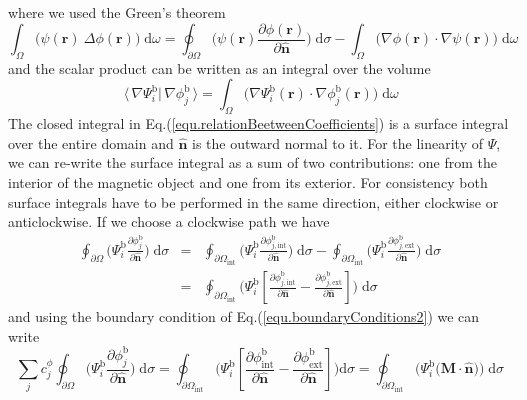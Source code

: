 \documentclass[11pt]{article}
\renewcommand{\d}{\mathrm{d}} %
\newcommand{\rv}[1]{\ensuremath{\mathbf{#1}}} %
\newcommand{\ivc}[1]{\,\langle\,#1|}
\begin{document}
where we used the Green's theorem
\begin{equation}
{\displaystyle \int}_\Omega \bigg( \psi(\rv{r}) \: \Delta \phi(\rv{r}) \bigg)\; \d\omega 
=
\oint_{\partial \Omega} 
\bigg( \psi(\rv{r}) 
\frac{\partial \phi(\rv{r})}{
  \partial \rv{\hat{n}}} \bigg) \; \d \sigma 
- 
\int_\Omega \bigg( \nabla  \phi(\rv{r}) \cdot \nabla  \psi(\rv{r}) \bigg)
\; \d\omega
\label{equ.greenTheorem}
\end{equation} 
and the scalar product can be written as an integral over the volume
\begin{equation}
\ivc{ \nabla \Psi^\mathrm{b}_{i}} \, 
  \nabla \phi^\mathrm{b}_{j} \,\rangle 
= \int_\Omega \bigg( \nabla  \Psi^\mathrm{b}_{i} (\rv{r}) \cdot \nabla
\phi^\mathrm{b}_{j} (\rv{r}) \bigg) 
\; \d\omega
\label{equ.scalarProductDefinition}
\end{equation}
The closed integral in  Eq.(\ref{equ.relationBeetweenCoefficients}) is
a surface integral over the entire domain and $\rv{\hat{n}}$ is the
outward normal to it.
For the linearity of $\Psi$, we can re-write the surface
integral as a sum of two contributions: one from the interior of the
magnetic object and one from its exterior. For consistency 
both surface integrals have to be performed in the same direction, 
either clockwise or anticlockwise. If we choose a clockwise path we
have 
\begin{eqnarray}
  \oint_{\partial \Omega} \bigg( \Psi^\mathrm{b}_{i}
  \frac{\partial \phi^\mathrm{b}_{j}}{ \partial \rv{\hat{n}}} \bigg)
  \;  \d\sigma 
  & = &
  \oint_{\partial \Omega_\mathrm{int}} \bigg( \Psi^\mathrm{b}_{i}
  \frac{\partial \phi^\mathrm{b}_{j, \mathrm{int}}}{ \partial \rv{\hat{n}}} \bigg)
  \;  \d\sigma
  -
  \oint_{\partial \Omega_\mathrm{int}} \bigg( \Psi^\mathrm{b}_{i}
  \frac{\partial \phi^\mathrm{b}_{j, \mathrm{ext}}}{ \partial \rv{\hat{n}}} \bigg)
  \;  \d\sigma
  \nonumber \\
  & = &
  \oint_{\partial \Omega_\mathrm{int}} \bigg( \Psi^\mathrm{b}_{i}
  \left[ 
    \frac{\partial \phi^\mathrm{b}_{j, \mathrm{int}}}{ \partial
      \rv{\hat{n}}} 
    - 
    \frac{\partial \phi^\mathrm{b}_{j, \mathrm{ext}}}{ \partial
      \rv{\hat{n}}} 
  \right]
  \bigg) 
  \;  \d\sigma
  \label{equ.clockwiseSum}
\end{eqnarray}
and using the boundary condition of Eq.(\ref{equ.boundaryConditions2}) 
we can write 
\begin{equation}
   \sum_j c^\phi_j \oint_{\partial \Omega} \bigg( \Psi^\mathrm{b}_{i}
  \frac{\partial \phi^\mathrm{b}_{j}}{ \partial \rv{\hat{n}}} \bigg)
  \;  \d\sigma 
  =
  \oint_{\partial \Omega_\mathrm{int}} \bigg( \Psi^\mathrm{b}_{i}
  \left[ 
    \frac{\partial \phi^\mathrm{b}_\mathrm{int}}{ \partial
      \rv{\hat{n}}} 
    - 
    \frac{\partial \phi^\mathrm{b}_\mathrm{ext}}{ \partial
      \rv{\hat{n}}} 
  \right]
  \bigg) 
  \d\sigma 
  =
  \oint_{\partial \Omega_\mathrm{int}} \bigg( \Psi^\mathrm{b}_{i}
  \Big( \rv{M}\cdot \rv{\hat{n}}\Big) \bigg) 
  \;  \d\sigma
\label{equ.surfaceIntegralsandMagnetization}
\end{equation}
\end{document}

